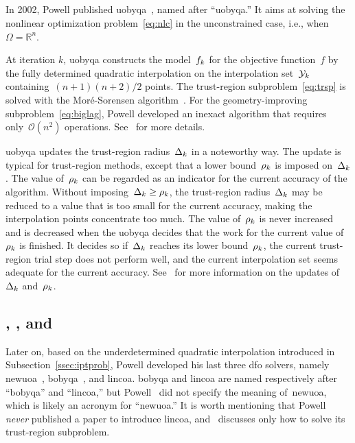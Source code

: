 \documentclass{article}
\numberwithin{equation}{section}
\theoremstyle{definition}
\theoremstyle{plain}
\theoremstyle{remark}
\newcommand*{\R}{\mathbb{R}}
\newcommand{\fset}{\Omega}
\newcommand{\objm}[1][k]{\obj\ifthenelse{\equal{#1}{}}{}{_{#1}}}
\newcommand{\obj}{f}
\newcommand{\radlb}[1][k]{\rho\ifthenelse{\equal{#1}{}}{}{_{#1}}}
\newcommand{\rad}[1][k]{\Delta\ifthenelse{\equal{#1}{}}{}{_{#1}}}
\newcommand{\xpt}[1][k]{\mathcal{Y}\ifthenelse{\equal{#1}{}}{}{_{#1}}}
\begin{document}
\subsection{}
\label{ssec:uobyqa}

In 2002, Powell published \gls{uobyqa}~\cite{Powell_2002}, named after ``\glsdesc{uobyqa}.''
It aims at solving the nonlinear optimization problem~\eqref{eq:nlc} in the unconstrained case, i.e., when~$\fset = \R^n$.

At iteration $k$, \gls{uobyqa} constructs the model~$\objm$ for the objective function~$\obj$ by the fully determined quadratic interpolation on the interpolation set~$\xpt$ containing~$(n + 1)(n + 2) / 2$ points.
The trust-region subproblem~\eqref{eq:trsp} is solved with the Mor{\'{e}}-Sorensen algorithm~\cite{More_Sorensen_1983}.
For the geometry-improving subproblem~\eqref{eq:biglag}, Powell developed an inexact algorithm that requires only~$\mathcal{O}(n^2)$ operations.
See~\cite[\S~2]{Powell_2002} for more details.

\Gls{uobyqa} updates the trust-region radius~$\rad$ in a noteworthy way.
The update is typical for trust-region methods, except that a lower bound~$\radlb$ is imposed on~$\rad$.
The value of~$\radlb[k]$ can be regarded as an indicator for the current accuracy of the algorithm.
Without imposing~$\rad[k] \ge \radlb[k]$, the trust-region radius~$\rad[k]$ may be reduced to a value that is too small for the current accuracy, making the interpolation points concentrate too much.
The value of~$\radlb[k]$ is never increased and is decreased when the \gls{uobyqa} decides that the work for the current value of~$\radlb[k]$ is finished.
It decides so if~$\rad[k]$ reaches its lower bound~$\radlb[k]$, the current trust-region trial step does not perform well, and the current interpolation set seems adequate for the current accuracy.
See~\cite[\S~3]{Powell_2002} for more information on the updates of~$\rad$ and~$\radlb[k]$.

\subsection{, , and }
\label{ssec:nbloa}

Later on, based on the underdetermined quadratic interpolation introduced in Subsection~\ref{ssec:iptprob}, Powell developed his last three \gls{dfo} solvers, namely \gls{newuoa}~\cite{Powell_2006,Powell_2008}, \gls{bobyqa}~\cite{Powell_2009}, and \gls{lincoa}.
\Gls{bobyqa} and \gls{lincoa} are named respectively after ``\glsdesc{bobyqa}'' and ``\glsdesc{lincoa},'' but Powell~\cite{Powell_2006,Powell_2008} did not specify the meaning of~\gls{newuoa}, which is likely an acronym for ``\glsdesc{newuoa}.''
It is worth mentioning that Powell \emph{never} published a paper to introduce \gls{lincoa}, and~\cite{Powell_2015} discusses only how to solve its trust-region subproblem.
\end{document}
